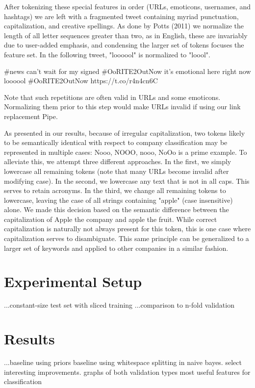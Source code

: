 \documentclass[letterpaper]{article}
\begin{document}
After tokenizing these special features in order (URLs, emoticons, usernames, and hashtags) we are left with a fragmented tweet containing myriad punctuation, capitalization, and creative spellings. As done by Potts (2011) we normalize the length of all letter sequences greater than two, as in English, these are invariably due to user-added emphasis, and condensing the larger set of tokens focuses the feature set. In the following tweet, "loooool" is normalized to "loool".

\#news can't wait for my signed \#OoRITE2OutNow it's emotional here right now loooool \#OoRITE2OutNow https://t.co/r4n4cn6C 

Note that such repetitions are often valid in URLs and some emoticons. Normalizing them prior to this step would make URLs invalid if using our link replacement Pipe.

As presented in our results, because of irregular capitalization, two tokens likely to be semantically identical with respect to company classification may be represented in multiple cases: {Nooo, NOOO, nooo, NoOo} is a prime example. To alleviate this, we attempt three different approaches. In the first, we simply lowercase all remaining tokens (note that many URLs become invalid after modifying case). In the second, we lowercase any text that is not in all caps. This serves to retain acronyms. In the third, we change all remaining tokens to lowercase, leaving the case of all strings containing "apple" (case insensitive) alone. We made this decision based on the semantic difference between the capitalization of Apple the company and apple the fruit. While correct capitalization is naturally not always present for this token, this is one case where capitalization serves to disambiguate. This same principle can be generalized to a larger set of keywords and applied to other companies in a similar fashion. 

\section{Experimental Setup}
...constant-size test set with sliced training
...comparison to n-fold validation

\section{Results}
...baseline using priors
  baseline using whitespace splitting in naive bayes.
  select interesting improvements.
  graphs of both validation types
  most useful features for classification
\end{document}
